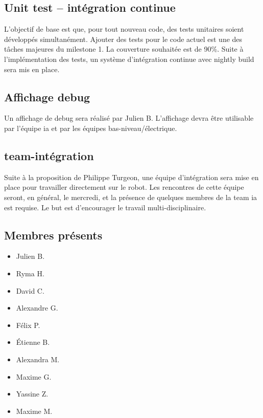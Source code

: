 \documentclass[12pt,letterpaper,twoside]{article}
\begin{document}
\subsection{Unit test -- int\'egration continue}
L'objectif de base est que, pour tout nouveau code, des tests unitaires soient développés simultanément.
Ajouter des tests pour le code actuel est une des tâches majeures du milestone 1.
La couverture souhaitée est de 90\%.
Suite à l'implémentation des tests, un système d'intégration continue avec nightly build sera mis en place.

\subsection{Affichage debug}
Un affichage de debug sera réalisé par Julien B. 
L'affichage devra être utilisable par l'équipe ia et par les équipes bas-niveau/électrique.

\subsection{team-intégration}
Suite à la proposition de Philippe Turgeon, une équipe d'intégration sera mise en place pour travailler directement sur le robot. 
Les rencontres de cette équipe seront, en général, le mercredi, et la présence de quelques membres de la team ia est requise.
Le but est d'encourager le travail multi-disciplinaire.


\subsection*{Membres présents}
\begin{itemize}
\item Julien B.
\item Ryma H.
\item David C.
\item Alexandre G.
\item Félix P.
\item Étienne B.
\item Alexandra M.
\item Maxime G.
\item Yassine Z.
\item Maxime M.
\end{itemize}
\end{document}
